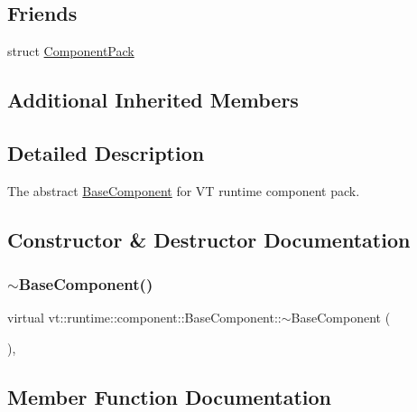 \subsection*{Friends}
\begin{DoxyCompactItemize}
\item 
struct \hyperlink{structvt_1_1runtime_1_1component_1_1_base_component_a82123f8d3dae68c38bd13d269d00b4c5}{Component\+Pack}
\end{DoxyCompactItemize}
\subsection*{Additional Inherited Members}


\subsection{Detailed Description}
The abstract {\ttfamily \hyperlink{structvt_1_1runtime_1_1component_1_1_base_component}{Base\+Component}} for VT runtime component pack. 

\subsection{Constructor \& Destructor Documentation}
\mbox{\label{structvt_1_1runtime_1_1component_1_1_base_component_a9190b5cb499f9cfdacc1e0bd98a1805a}} 
\subsubsection{\texorpdfstring{$\sim$\+Base\+Component()}{~BaseComponent()}}
{\footnotesize\ttfamily virtual vt\+::runtime\+::component\+::\+Base\+Component\+::$\sim$\+Base\+Component (\begin{DoxyParamCaption}{ }\end{DoxyParamCaption})\hspace{0.3cm}{\ttfamily [inline]}, {\ttfamily [virtual]}}



\subsection{Member Function Documentation}
\mbox{\label{structvt_1_1runtime_1_1component_1_1_base_component_a43eeed44aa64c77f5491abb4f5a39e9a}} 
